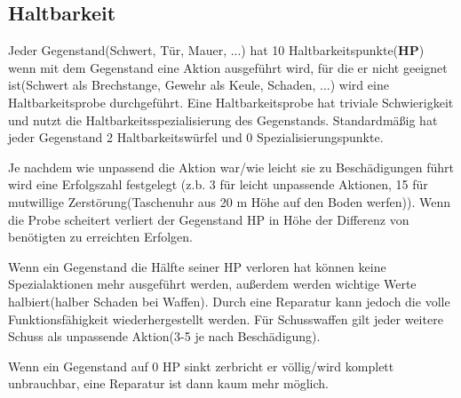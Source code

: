 \subsection{Haltbarkeit}
Jeder Gegenstand(Schwert, Tür, Mauer, ...) hat 10 Haltbarkeitspunkte(\textbf{HP}) wenn mit dem Gegenstand eine Aktion ausgeführt wird, für die er nicht geeignet ist(Schwert als Brechstange, Gewehr als Keule, Schaden, ...) wird eine Haltbarkeitsprobe durchgeführt. Eine Haltbarkeitsprobe hat triviale Schwierigkeit und nutzt die Haltbarkeitsspezialisierung des Gegenstands. Standardmäßig hat jeder Gegenstand 2 Haltbarkeitswürfel und 0 Spezialisierungspunkte.

Je nachdem wie unpassend die Aktion war/wie leicht sie zu Beschädigungen führt wird eine Erfolgszahl festgelegt (z.b. 3 für leicht unpassende Aktionen, 15 für mutwillige Zerstörung(Taschenuhr aus 20 m Höhe auf den Boden werfen)). Wenn die Probe scheitert verliert der Gegenstand HP in Höhe der Differenz von benötigten zu erreichten Erfolgen.

Wenn ein Gegenstand die Hälfte seiner HP verloren hat können keine Spezialaktionen mehr ausgeführt werden, außerdem werden wichtige Werte halbiert(halber Schaden bei Waffen). Durch eine Reparatur kann jedoch die volle Funktionsfähigkeit wiederhergestellt werden. Für Schusswaffen gilt jeder weitere Schuss als unpassende Aktion(3-5 je nach Beschädigung).

Wenn ein Gegenstand auf 0 HP sinkt zerbricht er völlig/wird komplett unbrauchbar, eine Reparatur ist dann kaum mehr möglich.

